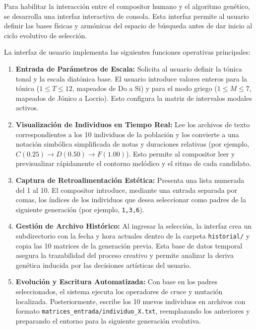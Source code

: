 \documentclass[12pt]{report}
\begin{document}
Para habilitar la interacción entre el compositor humano y el algoritmo genético, se desarrolla una interfaz interactiva de consola. Esta interfaz permite al usuario definir las bases físicas y armónicas del espacio de búsqueda antes de dar inicio al ciclo evolutivo de selección.

La interfaz de usuario implementa las siguientes funciones operativas principales:
\begin{enumerate}
    \item \textbf{Entrada de Parámetros de Escala:} Solicita al usuario definir la tónica tonal y la escala diatónica base. El usuario introduce valores enteros para la tónica ($1 \leq T \leq 12$, mapeados de Do a Si) y para el modo griego ($1 \leq M \leq 7$, mapeados de Jónico a Locrio). Esto configura la matriz de intervalos modales activos.

    \item \textbf{Visualización de Individuos en Tiempo Real:} Lee los archivos de texto correspondientes a los 10 individuos de la población y los convierte a una notación simbólica simplificada de notas y duraciones relativas (por ejemplo, $C(0.25)\rightarrow D(0.50)\rightarrow F(1.00)$). Esto permite al compositor leer y previsualizar rápidamente el contorno melódico y el ritmo de cada candidato.

    \item \textbf{Captura de Retroalimentación Estética:} Presenta una lista numerada del 1 al 10. El compositor introduce, mediante una entrada separada por comas, los índices de los individuos que desea seleccionar como padres de la siguiente generación (por ejemplo, \texttt{1,3,6}).

    \item \textbf{Gestión de Archivo Histórico:} Al ingresar la selección, la interfaz crea un subdirectorio con la fecha y hora actuales dentro de la carpeta \texttt{historial/} y copia las 10 matrices de la generación previa. Esta base de datos temporal asegura la trazabilidad del proceso creativo y permite analizar la deriva genética inducida por las decisiones artísticas del usuario.

    \item \textbf{Evolución y Escritura Automatizada:} Con base en los padres seleccionados, el sistema ejecuta los operadores de cruce y mutación localizada. Posteriormente, escribe los 10 nuevos individuos en archivos con formato \texttt{matrices\_entrada/individuo\_X.txt}, reemplazando los anteriores y preparando el entorno para la siguiente generación evolutiva.
\end{enumerate}
\end{document}
